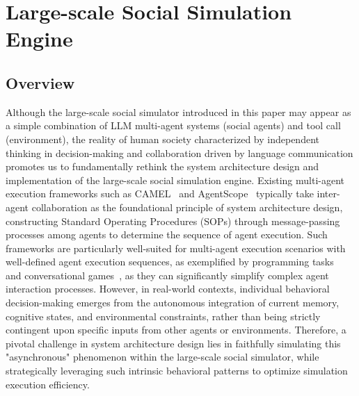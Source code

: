 \section{Large-scale Social Simulation Engine}\label{sec:engine}

\subsection{Overview}



Although the large-scale social simulator introduced in this paper may appear as a simple combination of LLM multi-agent systems (social agents) and tool call (environment), the reality of human society characterized by independent thinking in decision-making and collaboration driven by language communication promotes us to fundamentally rethink the system architecture design and implementation of the large-scale social simulation engine.
Existing multi-agent execution frameworks such as CAMEL~\cite{li2023camel} and AgentScope~\cite{gao2024agentscope} typically take inter-agent collaboration as the foundational principle of system architecture design, constructing Standard Operating Procedures (SOPs) through message-passing processes among agents to determine the sequence of agent execution.
Such frameworks are particularly well-suited for multi-agent execution scenarios with well-defined agent execution sequences, as exemplified by programming tasks~\cite{hong2023metagpt,qian2024chatdev} and conversational games~\cite{xu2023exploring}, as they can significantly simplify complex agent interaction processes.
However, in real-world contexts, individual behavioral decision-making emerges from the autonomous integration of current memory, cognitive states, and environmental constraints, rather than being strictly contingent upon specific inputs from other agents or environments.
Therefore, a pivotal challenge in system architecture design lies in faithfully simulating this "asynchronous" phenomenon within the large-scale social simulator, while strategically leveraging such intrinsic behavioral patterns to optimize simulation execution efficiency.

